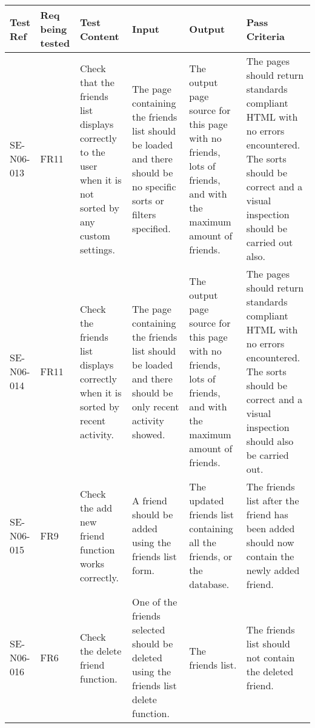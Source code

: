 \documentclass[titlepage]{article}
\begin{document}
\begin{tabular}{|p{1cm}|p{1cm}|p{3cm}|p{3cm}|p{2cm}|p{3cm}|}
\hline
Test Ref & Req being tested & Test Content & Input & Output & Pass Criteria \\ 
\hline
SE-N06-013 & FR11 & Check that the friends list displays correctly to the user when it is not sorted by any custom settings. & The page containing the friends list should be loaded and there should be no specific sorts or filters specified. & The output page source for this page with no friends, lots of friends, and with the maximum amount of friends. & The pages should return standards compliant HTML with no errors encountered. 
The sorts should be correct and a visual inspection should be carried out also.\\
\hline
SE-N06-014 & FR11 & Check the friends list displays correctly when it is sorted by recent activity. & The page containing the friends list should be loaded and there should be only recent activity showed. & The output page source for this page with no friends, lots of friends, and with the maximum amount of friends. & The pages should return standards compliant HTML with no errors encountered. The sorts should be correct and a visual inspection should also be carried out.\\
\hline
SE-N06-015 & FR9 & Check the add new friend function works correctly. & A friend should be added using the friends list form. & The updated friends list containing all the friends, or the database. & The friends list after the friend has been added should now contain the newly added friend.\\
\hline
SE-N06-016 & FR6 & Check the delete friend function. & One of the friends selected should be deleted using the friends list delete function. & The friends list. & The friends list should not contain the deleted friend.\\
\hline
\end{tabular}
\newpage
\end{document}
